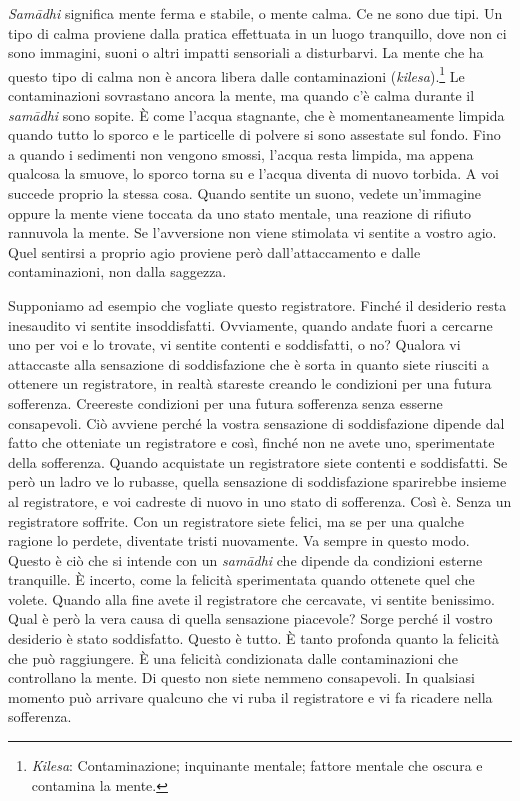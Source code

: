 \emph{Samādhi} significa mente ferma e stabile, o mente calma. Ce ne
sono due tipi. Un tipo di calma proviene dalla pratica effettuata in un
luogo tranquillo, dove non ci sono immagini, suoni o altri impatti
sensoriali a disturbarvi. La mente che ha questo tipo di calma non è
ancora libera dalle contaminazioni (\emph{kilesa}).\footnote{\emph{Kilesa}:
  Contaminazione; inquinante mentale; fattore mentale che oscura e
  contamina la mente.} Le contaminazioni sovrastano ancora la mente, ma
quando c'è calma durante il \emph{samādhi} sono sopite. È come l'acqua
stagnante, che è momentaneamente limpida quando tutto lo sporco e le
particelle di polvere si sono assestate sul fondo. Fino a quando i
sedimenti non vengono smossi, l'acqua resta limpida, ma appena qualcosa
la smuove, lo sporco torna su e l'acqua diventa di nuovo torbida. A voi
succede proprio la stessa cosa. Quando sentite un suono, vedete
un'immagine oppure la mente viene toccata da uno stato mentale, una
reazione di rifiuto rannuvola la mente. Se l'avversione non viene
stimolata vi sentite a vostro agio. Quel sentirsi a proprio agio
proviene però dall'attaccamento e dalle contaminazioni, non dalla
saggezza.

Supponiamo ad esempio che vogliate questo registratore. Finché il
desiderio resta inesaudito vi sentite insoddisfatti. Ovviamente, quando
andate fuori a cercarne uno per voi e lo trovate, vi sentite contenti e
soddisfatti, o no? Qualora vi attaccaste alla sensazione di
soddisfazione che è sorta in quanto siete riusciti a ottenere un
registratore, in realtà stareste creando le condizioni per una futura
sofferenza. Creereste condizioni per una futura sofferenza senza esserne
consapevoli. Ciò avviene perché la vostra sensazione di soddisfazione
dipende dal fatto che otteniate un registratore e così, finché non ne
avete uno, sperimentate della sofferenza. Quando acquistate un
registratore siete contenti e soddisfatti. Se però un ladro ve lo
rubasse, quella sensazione di soddisfazione sparirebbe insieme al
registratore, e voi cadreste di nuovo in uno stato di sofferenza. Così
è. Senza un registratore soffrite. Con un registratore siete felici, ma
se per una qualche ragione lo perdete, diventate tristi nuovamente. Va
sempre in questo modo. Questo è ciò che si intende con un \emph{samādhi}
che dipende da condizioni esterne tranquille. È incerto, come la
felicità sperimentata quando ottenete quel che volete. Quando alla fine
avete il registratore che cercavate, vi sentite benissimo. Qual è però
la vera causa di quella sensazione piacevole? Sorge perché il vostro
desiderio è stato soddisfatto. Questo è tutto. È tanto profonda quanto
la felicità che può raggiungere. È una felicità condizionata dalle
contaminazioni che controllano la mente. Di questo non siete nemmeno
consapevoli. In qualsiasi momento può arrivare qualcuno che vi ruba il
registratore e vi fa ricadere nella sofferenza.

